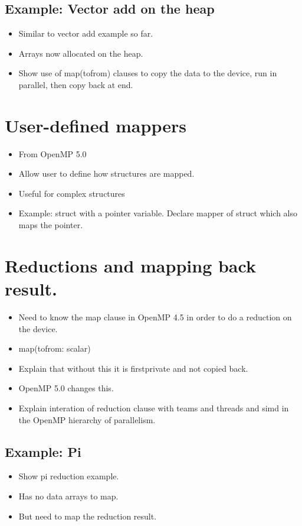 \subsection{Example: Vector add on the heap}
\begin{itemize}
  \item Similar to vector add example so far.
  \item Arrays now allocated on the heap.
  \item Show use of map(tofrom) clauses to copy the data to the device, run in parallel, then copy back at end.
\end{itemize}

\section{User-defined mappers}
\begin{itemize}
  \item From OpenMP 5.0
  \item Allow user to define how structures are mapped.
  \item Useful for complex structures
  \item Example: struct with a pointer variable. Declare mapper of struct which also maps the pointer.
\end{itemize}

\section{Reductions and mapping back result.}
\begin{itemize}
  \item Need to know the map clause in OpenMP 4.5 in order to do a reduction on the device.
  \item map(tofrom: scalar)
  \item Explain that without this it is firstprivate and not copied back.
  \item OpenMP 5.0 changes this.
  \item Explain interation of reduction clause with teams and threads and simd in the OpenMP hierarchy of parallelism.
\end{itemize}

\subsection{Example: Pi}
\begin{itemize}
  \item Show pi reduction example.
  \item Has no data arrays to map.
  \item But need to map the reduction result.
\end{itemize}

